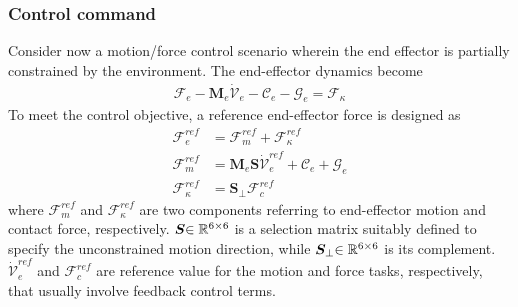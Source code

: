 \subsubsection{Control command}
Consider now a motion/force control scenario wherein the end effector is
partially constrained by the environment.
The end-effector dynamics become
%
\begin{align}
  \mathcal{F}_{e} - \bm{M}_{e}\dot{\mathcal{V}}_{e} - \mathcal{C}_{e} - \mathcal{G}_{e} = \mathcal{F}_{\kappa}
\end{align}
%
To meet the control objective, a reference end-effector force is designed as
%
\begin{align}
  \mathcal{F}_{e}^{ref} &= \mathcal{F}_{m}^{ref} + \mathcal{F}_{\kappa}^{ref}\label{eq:FREF_OS}\\
  \mathcal{F}_{m}^{ref} &= \bm{M}_{e}\bm{S}\dot{\mathcal{V}}_{e}^{ref} + \mathcal{C}_{e} + \mathcal{G}_{e}\\
  \mathcal{F}_{\kappa}^{ref} &= \bm{S}_{\perp}\mathcal{F}_{c}^{ref}
\end{align}
%
where $\mathcal{F}_{m}^{ref}$ and $\mathcal{F}_{\kappa}^{ref}$ are two components referring to
end-effector motion and contact force, respectively.
$\bm{S}{\in\mathbb{R}^{6 \times 6}}$ is a selection matrix suitably defined to specify the unconstrained motion direction,
while $\bm{S}_{\perp}{\in\mathbb{R}^{6 \times 6}}$ is its complement.
$\dot{\mathcal{V}}_{e}^{ref}$ and $\mathcal{F}_{c}^{ref}$ are reference value for the motion and
force tasks, respectively,
that usually involve feedback control terms.

